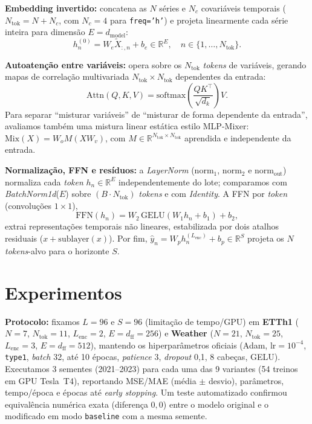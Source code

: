 \documentclass[conference]{IEEEtran}
\begin{document}
\textbf{Embedding invertido:} concatena as $N$ séries e $N_c$ covariáveis temporais ($N_{\text{tok}} = N + N_c$, com $N_c=4$ para \texttt{freq='h'}) e projeta linearmente cada série inteira para dimensão $E=d_{\text{model}}$:
\begin{equation}
h_n^{(0)} = W_e \tilde{X}_{:,n} + b_e \in \mathbb{R}^{E}, \quad n \in \{1,\dots,N_{\text{tok}}\}.
\end{equation}

\textbf{Autoatenção entre variáveis:} opera sobre os $N_{\text{tok}}$ \emph{tokens} de variáveis, gerando mapas de correlação multivariada $N_{\text{tok}} \times N_{\text{tok}}$ dependentes da entrada:
\begin{equation}
\mathrm{Attn}(Q,K,V) = \mathrm{softmax}\!\left(\frac{QK^\top}{\sqrt{d_k}}\right)V.
\end{equation}
Para separar ``misturar variáveis'' de ``misturar de forma dependente da entrada'', avaliamos também uma mistura linear estática estilo MLP-Mixer: $\mathrm{Mix}(X) = W_o M (X W_v)$, com $M \in \mathbb{R}^{N_{\text{tok}} \times N_{\text{tok}}}$ aprendida e independente da entrada.

\textbf{Normalização, FFN e resíduos:} a \emph{LayerNorm} ($\mathrm{norm}_1$, $\mathrm{norm}_2$ e $\mathrm{norm}_{\text{out}}$) normaliza cada \emph{token} $h_n \in \mathbb{R}^E$ independentemente do lote; comparamos com \emph{BatchNorm1d}($E$) sobre $(B{\cdot}N_{\text{tok}})$ \emph{tokens} e com \emph{Identity}. A FFN por \emph{token} (convoluções $1{\times}1$),
\begin{equation}
\mathrm{FFN}(h_n) = W_2\,\mathrm{GELU}(W_1 h_n + b_1) + b_2,
\end{equation}
extrai representações temporais não lineares, estabilizada por dois atalhos residuais ($x + \mathrm{sublayer}(x)$). Por fim, $\hat{y}_n = W_p h_n^{(L_{\text{enc}})} + b_p \in \mathbb{R}^S$ projeta os $N$ \emph{tokens}-alvo para o horizonte $S$.

\section{Experimentos}
\textbf{Protocolo:} fixamos $L{=}96$ e $S{=}96$ (limitação de tempo/GPU) em \textbf{ETTh1} ($N{=}7$, $N_{\text{tok}}{=}11$, $L_{\text{enc}}{=}2$, $E{=}d_{\text{ff}}{=}256$) e \textbf{Weather} ($N{=}21$, $N_{\text{tok}}{=}25$, $L_{\text{enc}}{=}3$, $E{=}d_{\text{ff}}{=}512$), mantendo os hiperparâmetros oficiais (Adam, $\text{lr}{=}10^{-4}$, \texttt{type1}, \emph{batch} 32, até 10 épocas, \emph{patience} 3, \emph{dropout} 0,1, 8 cabeças, GELU). Executamos 3 sementes (2021--2023) para cada uma das 9 variantes (54 treinos em GPU Tesla~T4), reportando MSE/MAE (média $\pm$ desvio), parâmetros, tempo/época e épocas até \emph{early stopping}. Um teste automatizado confirmou equivalência numérica exata (diferença $0{,}0$) entre o modelo original e o modificado em modo \texttt{baseline} com a mesma semente.
\end{document}
